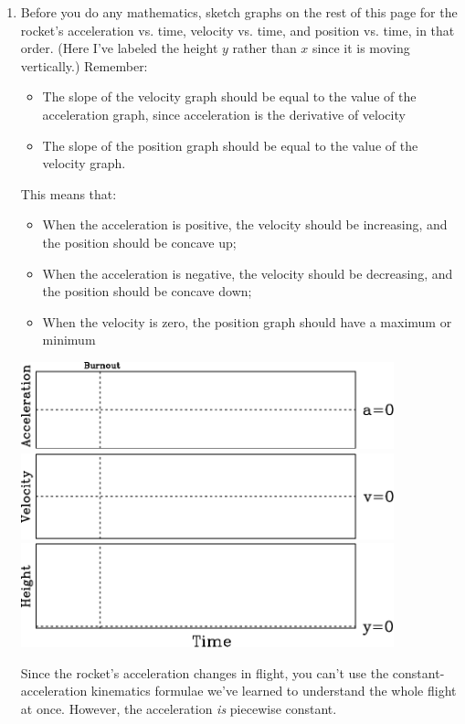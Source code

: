 \documentclass[12pt]{article}
\newcommand{\BI}{\begin{itemize}}
\newcommand{\EI}{\end{itemize}}
\begin{document}
\begin{enumerate}
\item{Before you do any mathematics, sketch graphs on the rest of this page for the rocket's acceleration vs. time, velocity vs. time, and position vs. time, in that order. (Here I've labeled the height $y$ rather than $x$ since it is moving vertically.) Remember:

\BI
\item The slope of the velocity graph should be equal to the value of the acceleration graph, since acceleration is the derivative of velocity
\item The slope of the position graph should be equal to the value of the velocity graph.
\EI

This means that:

\BI
\item When the acceleration is positive, the velocity should be increasing, and the position should be concave up;
\item When the acceleration is negative, the velocity should be decreasing, and the position should be concave down;
\item When the velocity is zero, the position graph should have a maximum or minimum
\EI
}
\begin{center}
\includegraphics[width=0.85\textwidth]{avst-plain-crop.pdf}\\
\includegraphics[width=0.85\textwidth]{vvst-plain-crop.pdf}\\
\includegraphics[width=0.85\textwidth]{xvst-plain-crop.pdf}
\end{center}
\newpage
Since the rocket's acceleration changes in flight, you can't use the constant-acceleration kinematics
formulae we've learned to understand the whole flight at once. However, the acceleration {\it is} piecewise constant.


\end{enumerate}
\end{document}
